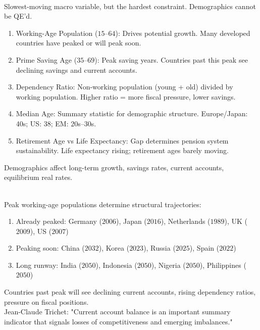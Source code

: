 \documentclass[a4paper,oneside,openany]{book}
\begin{document}
\begin{remark} \\
Slowest-moving macro variable, but the hardest constraint. Demographics cannot be QE'd.
\begin{enumerate}[label=\roman*.]
\setlength{\itemsep}{0pt}
\item Working-Age Population ($15$--$64$): Drives potential growth. Many developed countries have peaked or will peak soon.
\item Prime Saving Age ($35$--$69$): Peak saving years. Countries past this peak see declining savings and current accounts.
\item Dependency Ratio: Non-working population (young + old) divided by working population. Higher ratio = more fiscal pressure, lower savings.
\item Median Age: Summary statistic for demographic structure. Europe/Japan: 40s; US: 38; EM: $20$s--$30$s.
\item Retirement Age vs Life Expectancy: Gap determines pension system sustainability. Life expectancy rising; retirement ages barely moving.
\end{enumerate}
Demographics affect long-term growth, savings rates, current accounts, equilibrium real rates.
\end{remark}

\begin{remark} \\
Peak working-age populations determine structural trajectories:
\begin{enumerate}[label=\roman*.]
\setlength{\itemsep}{0pt}
\item Already peaked: Germany ($2006$), Japan ($2016$), Netherlands ($1989$), UK ($2009$), US ($2007$)
\item Peaking soon: China ($2032$), Korea ($2023$), Russia ($2025$), Spain ($2022$)
\item Long runway: India ($2050$), Indonesia ($2050$), Nigeria ($2050$), Philippines ($2050$)
\end{enumerate}
Countries past peak will see declining current accounts, rising dependency ratios, pressure on fiscal positions.\\
Jean-Claude Trichet: "Current account balance is an important summary indicator that signals losses of competitiveness and emerging imbalances."
\end{remark}
\end{document}
